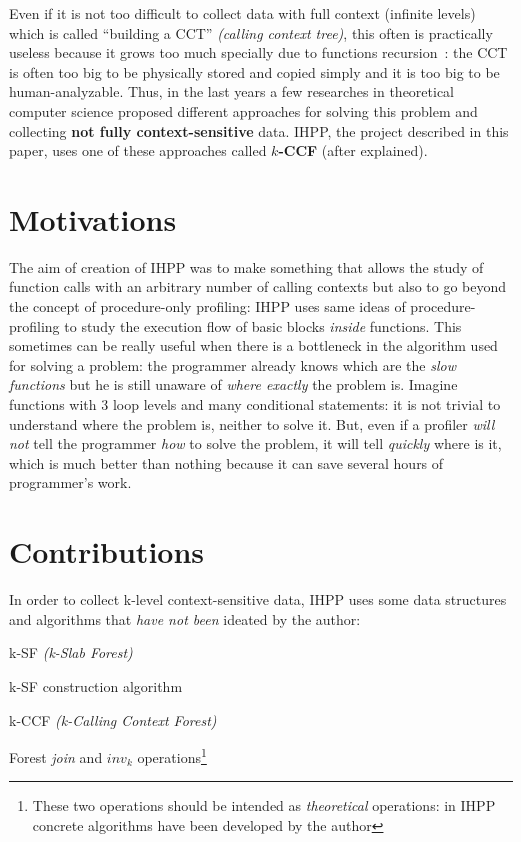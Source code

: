 \documentclass[a4paper,10pt]{report}
\begin{document}
Even if it is not too difficult to collect data with full context (infinite
levels) which is called ``building a CCT'' \emph{(calling context
tree)}, this often is practically useless because it grows too much specially due to
functions recursion~\cite{kccf}: the CCT is often too big to be physically stored and copied
simply and it is too big to be human-analyzable.
Thus, in the last years a few researches in theoretical computer science 
proposed different approaches for solving this problem and collecting \textbf{not fully context-sensitive} data. IHPP, the project described in this paper, uses one of these approaches called \textbf{$k$-CCF} (after explained).

\section{Motivations}

The aim of creation of IHPP was to make something that allows the study of
function calls with an arbitrary number of calling contexts but also to go
beyond the concept of procedure-only profiling: IHPP uses same ideas of
procedure-profiling to study the execution flow of basic blocks \emph{inside}
 functions. This sometimes can be really useful when there is a bottleneck in
the algorithm used for solving a problem: the programmer already knows which are
the \emph{slow functions} but he is still unaware of \emph{where exactly}
the problem is. Imagine functions with 3 loop levels and many conditional
statements: it is not trivial to understand where the problem is, neither to
solve it. But, even if a profiler \emph{will not} tell the programmer \emph{how}
to solve the problem, it will tell \emph{quickly} where is it, which is much
better than nothing because it can save several hours of programmer's work.

\section{Contributions}

In order to collect k-level context-sensitive data, IHPP uses some data
structures and algorithms that \emph{have not been} ideated by the author:

\begin{itemize*}
\item k-SF \emph{(k-Slab Forest)}
\item k-SF construction algorithm
\item k-CCF \emph{(k-Calling Context Forest)}
\item Forest \emph{join} and $inv_k$ operations\footnote{These two operations should
be intended as \emph{theoretical} operations: in IHPP concrete algorithms have been
developed by the author}
\end{itemize*}
\end{document}
